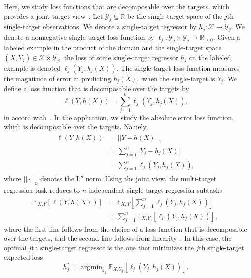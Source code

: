 \documentclass[aps,twocolumn,superscriptaddress,floatfix,preprintnumbers,showkeys]{revtex4}
\DeclareMathOperator*{\argmin}{\arg\!\min}
\begin{document}
Here, we study loss functions that are decomposable over the targets, which provides a joint target view~\cite{Borchani_2015, Waegeman_2019}. Let $\mathcal{Y}_{j} \subseteq \mathbb{R}$ be the single-target space of the $j$th single-target observations. We denote a single-target regressor by
$ h_{j}: \mathcal{X} \to \mathcal{Y}_{j}.$ We denote a nonnegative single-target loss function by 
$\ell_{j}: \mathcal{Y}_{j} \times \mathcal{Y}_{j} \to \mathbb{R}_{\geq 0}.$
Given a labeled example in the product of the domain and the single-target space $(X, Y_{j}) \in \mathcal{X} \times \mathcal{Y}_{j},$ the loss of some single-target regressor $h_{j}$ on the labeled example is denoted $\ell_{j}(Y_{j}, h_{j}(X)).$ The single-target loss function measures the magnitude of error in predicting $h_{j}(X),$ when the single-target is $Y_{j}.$ We define a loss function that is decomposable over the targets by  
\begin{equation}
\ell(Y, h(X)) = \sum_{j=1}^{n} \ell_{j}(Y_{j}, h_{j}(X)),
\end{equation}
in accord with~\cite{Borchani_2015, Waegeman_2019}. In the application, we study the absolute error loss function, which is decomposable over the targets. Namely,
\begin{align}
\label{eq:absolute_error_loss_function}
\begin{split}
\ell(Y, h(X)) &= ||Y - h(X) ||_{1} \\
&= \sum_{j=1}^{n} |Y_{j} - h_{j}(X)| \\
&= \sum_{j=1}^{n} \ell_{j}(Y_{j}, h_{j}(X)),
\end{split}
\end{align}
where $||\cdot||_{p}$ denotes the $\mbox{L}^{p}$ norm. Using the joint view, the multi-target regression task reduces to $n$ independent single-target regression subtasks
\begin{align}
\mathbb{E}_{X,Y} [\ell(Y, h(X))] &= \mathbb{E}_{X,Y} [\sum_{j=1}^{n} \ell_{j}(Y_{j}, h_{j}(X))] \nonumber \\
&= \sum_{j=1}^{n} \mathbb{E}_{X,Y_{j}} [\ell_{j}(Y_{j}, h_{j}(X))] \label{eq:single_target_expected_loss},
\end{align}
where the first line follows from the choice of a loss function that is decomposable over the targets, and the second line follows from linearity~\cite{Borchani_2015, Waegeman_2019}. In this case, the optimal $j$th single-target regressor is the one that minimizes the $j$th single-target expected loss
\begin{equation}
h^{*}_{j} = \argmin_{h_{j}} \mathbb{E}_{X,Y_{j}} [\ell_{j}(Y_{j}, h_{j}(X))].
\end{equation}
\end{document}

